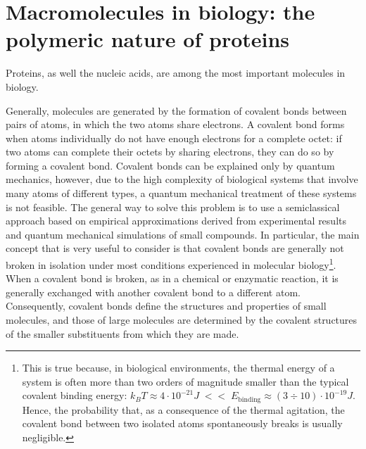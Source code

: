 \section{Macromolecules in biology: the polymeric nature of proteins}\label{sec:polym-prot}
Proteins, as well the nucleic acids, are among the most important molecules in biology. 

Generally, molecules are generated by the formation of covalent bonds between pairs of atoms, in which the two atoms share electrons. A covalent bond forms when atoms individually do not have enough electrons for a complete octet: if two atoms can complete their octets by sharing electrons, they can do so by forming a covalent bond. Covalent bonds can be explained only by quantum mechanics, however, due to the high complexity of biological systems that involve many atoms of different types, a quantum mechanical treatment of these systems is not feasible.
The general way to solve this problem is to use a semiclassical approach based on empirical approximations derived from experimental results and quantum mechanical simulations of small compounds. In particular, the main concept that is very useful to consider is that covalent bonds are generally not broken in isolation under most conditions experienced in molecular biology\footnote{This is true because, in biological environments, the thermal energy of a system is often more than two orders of magnitude smaller than the typical covalent binding energy: $k_B T \approx 4 \cdot 10^{-21} J \; << \; E_{\text{binding}} \approx (3 \div 10) \cdot 10^{-19} J$. Hence, the probability that, as a consequence of the thermal agitation, the covalent bond between two isolated atoms spontaneously breaks is usually negligible.}. When a covalent bond is broken, as in a chemical or enzymatic reaction, it is generally exchanged with another covalent bond to a different atom. Consequently, covalent bonds define the structures and properties of small molecules, and those of large molecules are determined by the covalent structures of the smaller substituents from which they are made.

